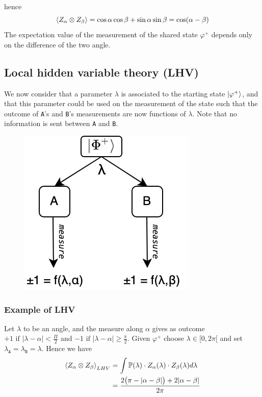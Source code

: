 \documentclass{article}
\begin{document}
hence
\begin{equation}
    \braket{Z_\alpha \otimes Z_\beta} =
        \cos \alpha \cos \beta + \sin \alpha \sin \beta = \cos(\alpha - \beta)
\end{equation}
The expectation value of the measurement of the shared state $\varphi^+$ depends
only on the difference of the two angle.

\subsection{Local hidden variable theory (LHV)}
We now consider that a parameter $\lambda$ is associated to the starting state
$\ket{\varphi^+}$, and that this parameter could be used on the measurement of the
state such that the outcome of \texttt{A}'s and \texttt{B}'s measurements are
now functions of $\lambda$. Note that no information is sent between \texttt{A}
and \texttt{B}.

\begin{figure}[h]
    \centering
    \includegraphics[scale=0.4]{bell-ineq-sharing-scheme-lhv.jpeg}
    \caption{}
\end{figure}
\subsubsection*{Example of LHV}
Let $\lambda$ to be an angle, and the measure along $\alpha$ gives as outcome
$+1 \text{ if } |\lambda - \alpha | < \frac{\Pi}{2}$ and $-1 \text{ if }
|\lambda - \alpha | \geq \frac{\pi}{2}$. Given $\varphi^+$ choose $ \lambda \in [0,
2\pi[$ and set $\lambda_\texttt{A} = \lambda_\texttt{B} = \lambda$. Hence we
have
\begin{equation}
    \begin{aligned}
        \braket{Z_\alpha \otimes Z_\beta}_{LHV}
            & = \int\mathbb{P}(\lambda) \cdot Z_\alpha(\lambda) \cdot Z_\beta(\lambda) d\lambda \\
            & = \frac{2\big(\pi - |\alpha - \beta|\big) + 2|\alpha-\beta|}{2\pi}
    \end{aligned}
\end{equation}
\end{document}
